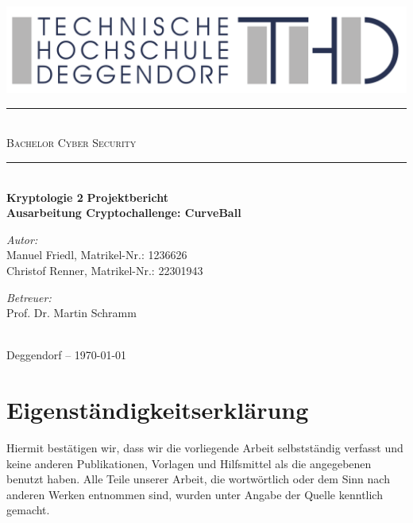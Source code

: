 \documentclass{article}
\begin{document}
\begin{titlepage}
  \begin{center}
    \includegraphics[width=\textwidth]{THD-Logo.pdf}
    \vspace{1cm}
    \rule{1\textwidth}{1mm} \\[0.3cm]
    \textsc{\scshape \huge Bachelor Cyber Security}\\
    \rule{1\textwidth}{1mm} \\[2cm]
    {
      \vspace{1cm}
      \Large \textbf{Kryptologie 2}
      \vspace{3cm}
      \Large \textbf{Projektbericht}
    }\\[0.5cm]
    \LARGE \textbf{Ausarbeitung Cryptochallenge: CurveBall}\\[2cm]
    \begin{minipage}[t]{0.4\textwidth}
      \begin{flushleft}
        \normalsize \emph{Autor:}\\[0.3cm]
        Manuel Friedl, Matrikel-Nr.: 1236626\\
        Christof Renner, Matrikel-Nr.: 22301943
      \end{flushleft}
    \end{minipage}
    \begin{minipage}[t]{0.5\textwidth}
      \begin{flushright}
        \normalsize \emph{Betreuer:}\\[0.3cm]
        Prof. Dr. Martin Schramm
      \end{flushright}
    \end{minipage}\\[3cm]
    {\large Deggendorf – \today\\}
  \end{center}
\end{titlepage}

\newpage
{}

\section*{Eigenständigkeitserklärung}
Hiermit bestätigen wir, dass wir die vorliegende Arbeit selbstständig verfasst und keine anderen Publikationen, Vorlagen und Hilfsmittel als die angegebenen benutzt haben. Alle Teile unserer Arbeit, die wortwörtlich oder dem Sinn nach anderen Werken entnommen sind, wurden unter Angabe der Quelle kenntlich gemacht.
\end{document}
